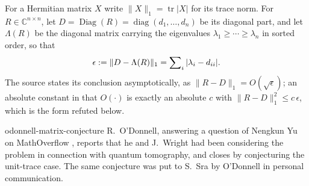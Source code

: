 
\begin{cxcredits}
\end{cxcredits}

\begin{cxcontext}
For a Hermitian matrix $X$ write $\lVert X\rVert_1=\operatorname{tr}|X|$ for its trace norm.  For $R\in\mathbb C^{n\times n}$, let $D=\operatorname{Diag}(R)=\operatorname{diag}(d_1,\ldots,d_n)$ be its diagonal
part, and let $\Lambda(R)$ be the diagonal matrix carrying the eigenvalues
$\lambda_1\geq\cdots\geq\lambda_n$ in sorted order, so that
\[
  \epsilon:=\lVert D-\Lambda(R)\rVert_1=\sum\nolimits_i|\lambda_i-d_{ii}|.
\]
The source states its conclusion asymptotically, as $\lVert R-D\rVert_1=O(\sqrt\epsilon)$; an
absolute constant in that $O(\cdot)$ is exactly an absolute $c$ with
$\lVert R-D\rVert_1^2\leq c\,\epsilon$, which is the form refuted below.

\end{cxcontext}

\begin{cxsource}{odonnell-matrix-conjecture}
R.~O'Donnell, answering a question of Nengkun Yu on MathOverflow
\cite{ODonnell2015AlmostDiagonal}, reports that he and J.~Wright had been
considering the problem in connection with quantum tomography, and closes by
conjecturing the unit-trace case.  The same conjecture was put to S.~Sra by
O'Donnell in personal communication.
\end{cxsource}

